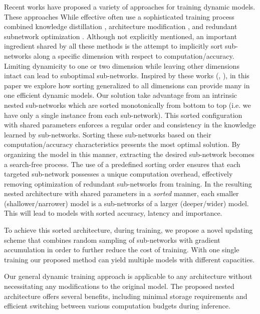 \documentclass[letterpaper]{article} %
\begin{document}
Recent works have proposed a variety of approaches for training dynamic models. These approaches While effective often use a sophisticated training process combined knowledge distillation \cite{hou2020dynabert}, architecture modification \cite{Nunez_2023_WACV}, and redundant subnetwork optimization \cite{fan2019reducing}. Although not explicitly mentioned, an important ingredient shared by all these methods is the attempt to implicitly sort sub-networks along a specific dimension with respect to computation/accuracy. Limiting dynamicity to one or two dimension while leaving other dimensions intact can lead to suboptimal sub-networks. %
Inspired by these works (\cite{valipour-etal-2023-dylora}, \cite{rippel2014learning}), in this paper we explore how sorting generalized to all dimensions can provide many in one efficient dynamic models. 
Our solution take advantage from an intrinsic nested sub-networks which are sorted monotonically from bottom to top (i.e. we have only a single instance from each sub-network). This sorted configuration with shared parameters enforces a regular order and consistency in the knowledge learned by sub-networks.
Sorting these sub-networks based on their computation/accuracy characteristics presents the most optimal solution. By organizing the model in this manner, extracting the desired sub-network becomes a search-free process. The use of a predefined sorting order ensures that each targeted sub-network possesses a unique computation overhead, effectively removing optimization of redundant sub-networks from training.
In the resulting nested architecture with shared parameters in a \textit{sorted} manner, each smaller (shallower/narrower) model is a sub-networks of a larger (deeper/wider) model. This will lead to models with sorted accuracy, latency and importance.


To achieve this sorted architecture, during training, we propose a novel updating scheme that combines random sampling of sub-networks with gradient accumulation in order to further reduce the cost of training. With one single training our proposed method can yield multiple models with different capacities. 

Our general dynamic training approach is applicable to any architecture without necessitating any modifications to the original model. The proposed nested architecture offers several benefits, including minimal storage requirements and efficient switching between various computation budgets during inference. 
\end{document}
